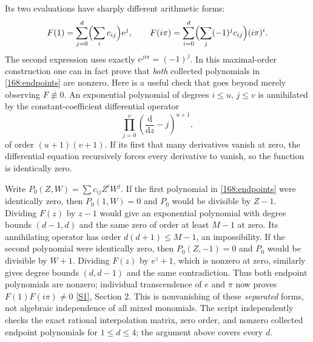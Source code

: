 \documentclass[11pt,a4paper]{article}
\newcommand{\sref}[2]{\hyperlink{source:#1:#2}{[S#2]}}
\numberwithin{equation}{section}
\begin{document}
Its two evaluations have sharply different arithmetic forms:
\begin{equation}\label{168:endpoints}
 F(1)=\sum_{j=0}^d\Bigl(\sum_i c_{ij}\Bigr)e^j,
 \qquad
 F(i\pi)=\sum_{i=0}^d\Bigl(\sum_j(-1)^jc_{ij}\Bigr)(i\pi)^i.
\end{equation}
The second expression uses exactly $e^{ji\pi}=(-1)^j$. In this
maximal-order construction one can in fact prove that \emph{both}
collected polynomials in \eqref{168:endpoints} are nonzero. Here is a
useful check that goes beyond merely observing $F\not\equiv0$.
An exponential polynomial of degrees $i\le u$, $j\le v$ is annihilated
by the constant-coefficient differential operator
\begin{equation}
 \prod_{j=0}^v\left(\frac{\mathrm d}{\mathrm dz}-j\right)^{u+1},
\end{equation}
of order $(u+1)(v+1)$. If its first that many derivatives vanish at
zero, the differential equation recursively forces every derivative
to vanish, so the function is identically zero.

Write $P_0(Z,W)=\sum c_{ij}Z^iW^j$. If the first polynomial in
\eqref{168:endpoints} were identically zero, then $P_0(1,W)=0$ and
$P_0$ would be divisible by $Z-1$. Dividing $F(z)$ by $z-1$ would give
an exponential polynomial with degree bounds $(d-1,d)$ and the same
zero of order at least $M-1$ at zero. Its annihilating operator has
order $d(d+1)\le M-1$, an impossibility. If the second polynomial were
identically zero, then $P_0(Z,-1)=0$ and $P_0$ would be divisible by
$W+1$. Dividing $F(z)$ by $e^z+1$, which is nonzero at zero, similarly
gives degree bounds $(d,d-1)$ and the same contradiction. Thus both
endpoint polynomials are nonzero; individual transcendence of $e$ and
$\pi$ now proves $F(1)F(i\pi)\ne0$ \sref{168}{1}, Section 2.
This is nonvanishing of these \emph{separated} forms, not algebraic
independence of all mixed monomials. The script independently checks
the exact rational interpolation matrix, zero order, and nonzero
collected endpoint polynomials for $1\le d\le4$; the argument above
covers every $d$.
\end{document}
